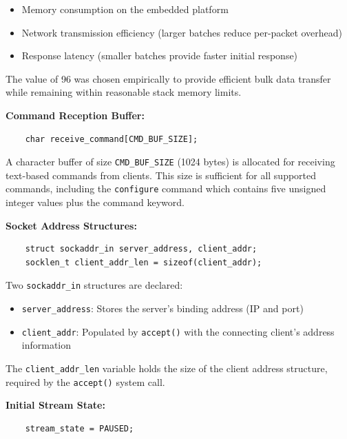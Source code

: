 \begin{itemize}
	\item Memory consumption on the embedded platform
	\item Network transmission efficiency (larger batches reduce per-packet overhead)
	\item Response latency (smaller batches provide faster initial response)
\end{itemize}

The value of 96 was chosen empirically to provide efficient bulk data transfer while remaining within reasonable stack memory limits.

\textbf{Command Reception Buffer:}

\begin{verbatim}
	char receive_command[CMD_BUF_SIZE];
\end{verbatim}

A character buffer of size \texttt{CMD\_BUF\_SIZE} (1024 bytes) is allocated for receiving text-based commands from clients. This size is sufficient for all supported commands, including the \texttt{configure} command which contains five unsigned integer values plus the command keyword.

\textbf{Socket Address Structures:}

\begin{verbatim}
	struct sockaddr_in server_address, client_addr;
	socklen_t client_addr_len = sizeof(client_addr);
\end{verbatim}

Two \texttt{sockaddr\_in} structures are declared:
\begin{itemize}
	\item \texttt{server\_address}: Stores the server's binding address (IP and port)
	\item \texttt{client\_addr}: Populated by \texttt{accept()} with the connecting client's address information
\end{itemize}

The \texttt{client\_addr\_len} variable holds the size of the client address structure, required by the \texttt{accept()} system call.

\textbf{Initial Stream State:}

\begin{verbatim}
	stream_state = PAUSED;
\end{verbatim}

